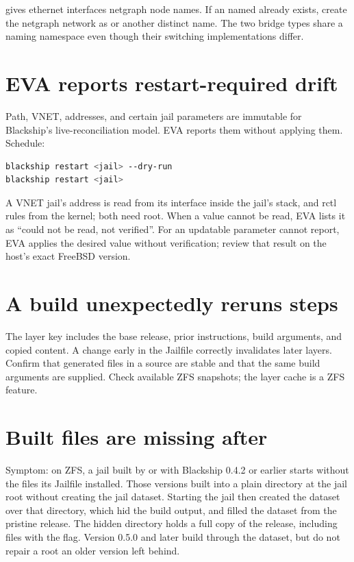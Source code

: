  gives ethernet interfaces netgraph node names. If an
 named  already exists, create the
netgraph network as  or another distinct name. The two bridge
types share a naming namespace even though their switching implementations
differ.

\section{EVA reports restart-required drift}

Path, VNET, addresses, and certain jail parameters are immutable for Blackship's
live-reconciliation model. EVA reports them without applying them. Schedule:

\begin{lstlisting}[language=bash]
blackship restart <jail> --dry-run
blackship restart <jail>
\end{lstlisting}

A VNET jail's address is read from its interface inside the jail's stack, and
rctl rules from the kernel; both need root. When a value cannot be read, EVA
lists it as ``could not be read, not verified''. For an updatable parameter
 cannot report, EVA applies the desired value without
verification; review that result on the host's exact FreeBSD version.

\section{A build unexpectedly reruns steps}

The layer key includes the base release, prior instructions, build arguments,
and copied content. A change early in the Jailfile correctly invalidates later
layers. Confirm that generated files in a  source are stable and
that the same build arguments are supplied. Check available ZFS snapshots; the
layer cache is a ZFS feature.

\section{Built files are missing after }

Symptom: on ZFS, a jail built by  or  with Blackship 0.4.2 or earlier starts without the files its Jailfile
installed. Those versions built into a plain directory at the jail root
without creating the jail dataset. Starting the jail then created the dataset
over that directory, which hid the build output, and filled the dataset from
the pristine release. The hidden directory holds a full copy of the release,
including files with the  flag. Version 0.5.0 and later build
through the dataset, but do not repair a root an older version left behind.

